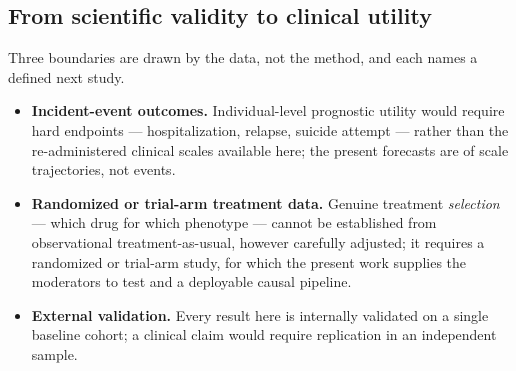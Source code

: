 \subsection{From scientific validity to clinical utility}
Three boundaries are drawn by the data, not the method, and each names a defined next study.
\begin{itemize}\setlength{\itemsep}{1pt}
  \item \textbf{Incident-event outcomes.} Individual-level prognostic utility would require hard endpoints
  --- hospitalization, relapse, suicide attempt --- rather than the re-administered clinical scales
  available here; the present forecasts are of scale trajectories, not events.
  \item \textbf{Randomized or trial-arm treatment data.} Genuine treatment \emph{selection} --- which drug
  for which phenotype --- cannot be established from observational treatment-as-usual, however carefully
  adjusted; it requires a randomized or trial-arm study, for which the present work supplies the moderators
  to test and a deployable causal pipeline.
  \item \textbf{External validation.} Every result here is internally validated on a single baseline cohort;
  a clinical claim would require replication in an independent sample.
\end{itemize}
